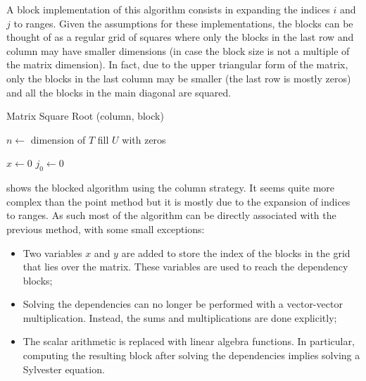 \documentclass[../thesis]{subfiles}
\begin{document}
	A block implementation of this algorithm consists in expanding the indices $i$ and $j$ to ranges. Given the assumptions for these implementations, the blocks can be thought of as a regular grid of squares where only the blocks in the last row and column may have smaller dimensions (in case the block size is not a multiple of the matrix dimension). In fact, due to the upper triangular form of the matrix, only the blocks in the last column may be smaller (the last row is mostly zeros) and all the blocks in the main diagonal are squared.

	\begin{algorithm}[htp]
		\caption{Matrix Square Root (column, block)}
		\label{alg:sqrtm:column:block}
		\DontPrintSemicolon


		$n \leftarrow$ dimension of $T$\;
		fill $U$ with zeros\;

		$x \leftarrow 0$\;
		$j_0 \leftarrow 0$\;
	\end{algorithm}

	 shows the blocked algorithm using the column strategy. It seems quite more complex than the point method but it is mostly due to the expansion of indices to ranges. As such most of the algorithm can be directly associated with the previous method, with some small exceptions:
	\begin{itemize}
		\item Two variables $x$ and $y$ are added to store the index of the blocks in the grid that lies over the matrix. These variables are used to reach the dependency blocks;
		\item Solving the dependencies can no longer be performed with a vector-vector multiplication. Instead, the sums and multiplications are done explicitly;
		\item The scalar arithmetic is replaced with linear algebra functions. In particular, computing the resulting block after solving the dependencies implies solving a Sylvester equation.
	\end{itemize}
\end{document}
